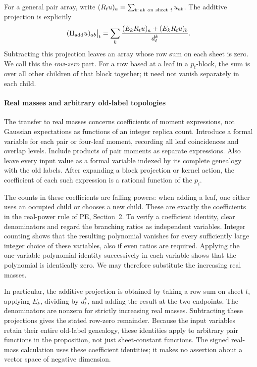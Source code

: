 For a general pair array, write
\((R_tu)_a=\sum_{b:\,ab\ {\rm on\ sheet}\ t}u_{ab}\).
The additive projection is explicitly
\[
 (\Pi_{\rm add}u)_{ab}\big|_t
 =\sum_k\frac{(E_kR_tu)_a+(E_kR_tu)_b}{d_t^k}.
\]
Subtracting this projection leaves an array whose row sum on each
sheet is zero. We call this the \emph{row-zero} part. For a
row based at a leaf in a \(p_t\)-block, the sum is over all other
children of that block together; it need not vanish separately in each
child.

\paragraph{Real masses and arbitrary old-label topologies}
The transfer to real masses concerns coefficients of moment expressions,
not Gaussian expectations as functions of an integer replica count.
Introduce a formal variable for each pair or four-leaf moment, recording
all leaf coincidences and overlap levels. Include products of pair
moments as separate expressions. Also leave every input value as a
formal variable indexed by its complete genealogy with the old labels.
After expanding a block projection or kernel action, the coefficient of
each such expression is a rational function of the \(p_i\).

The counts in these coefficients are falling powers: when adding a leaf,
one either uses an occupied child or chooses a new child. These are
exactly the coefficients in the real-power rule of PE, Section~2.
To verify a coefficient identity, clear denominators and regard the
branching ratios as independent variables. Integer counting shows that
the resulting polynomial vanishes for every sufficiently large integer
choice of these variables, also if even ratios are required. Applying
the one-variable polynomial identity successively in each variable
shows that the polynomial is identically zero. We may therefore
substitute the increasing real masses.

In particular, the additive projection is obtained by taking a row sum
on sheet \(t\), applying \(E_k\), dividing by \(d_t^k\), and adding
the result at the two endpoints. The denominators are nonzero for
strictly increasing real masses. Subtracting these projections gives
the stated row-zero remainder. Because the input variables retain
their entire old-label genealogy, these identities apply to arbitrary
pair functions in the proposition, not just sheet-constant functions.
The signed real-mass calculation uses these coefficient identities;
it makes no assertion about a vector space of negative dimension.

